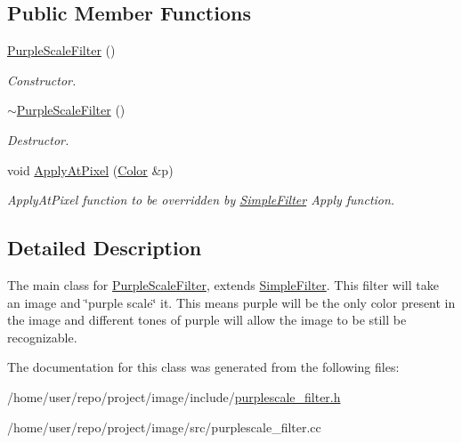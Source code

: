 \subsection*{Public Member Functions}
\begin{DoxyCompactItemize}
\item 
\mbox{\label{classPurpleScaleFilter_a7356afa48e204b7fb6c7cc8a6c58f3e6}} 
\hyperlink{classPurpleScaleFilter_a7356afa48e204b7fb6c7cc8a6c58f3e6}{Purple\+Scale\+Filter} ()
\begin{DoxyCompactList}\small\item\em Constructor. \end{DoxyCompactList}\item 
\mbox{\label{classPurpleScaleFilter_ab5d76a8c1f8fa50bb1d2c905eb2cabc4}} 
\hyperlink{classPurpleScaleFilter_ab5d76a8c1f8fa50bb1d2c905eb2cabc4}{$\sim$\+Purple\+Scale\+Filter} ()
\begin{DoxyCompactList}\small\item\em Destructor. \end{DoxyCompactList}\item 
\mbox{\label{classPurpleScaleFilter_a4e1adaffb90f7f978e2fe000b52b7a5e}} 
void \hyperlink{classPurpleScaleFilter_a4e1adaffb90f7f978e2fe000b52b7a5e}{Apply\+At\+Pixel} (\hyperlink{classColor}{Color} \&p)
\begin{DoxyCompactList}\small\item\em Apply\+At\+Pixel function to be overridden by \hyperlink{classSimpleFilter}{Simple\+Filter} Apply function. \end{DoxyCompactList}\end{DoxyCompactItemize}


\subsection{Detailed Description}
The main class for \hyperlink{classPurpleScaleFilter}{Purple\+Scale\+Filter}, extends \hyperlink{classSimpleFilter}{Simple\+Filter}. This filter will take an image and \char`\"{}purple scale\char`\"{} it. This means purple will be the only color present in the image and different tones of purple will allow the image to be still be recognizable. 

The documentation for this class was generated from the following files\+:\begin{DoxyCompactItemize}
\item 
/home/user/repo/project/image/include/\hyperlink{purplescale__filter_8h}{purplescale\+\_\+filter.\+h}\item 
/home/user/repo/project/image/src/purplescale\+\_\+filter.\+cc\end{DoxyCompactItemize}
